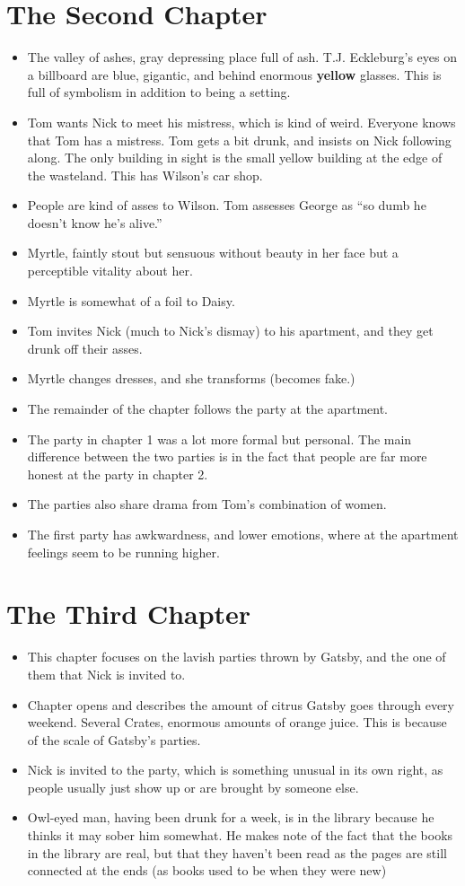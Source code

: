 \documentclass[12pt]{article}
\begin{document}
\section{The Second Chapter}
\begin{itemize}
\item The valley of ashes, gray depressing place full of ash.  T.J. 
  Eckleburg's eyes on a billboard are blue, gigantic, and behind 
  enormous {\bf yellow} glasses.  This is full of symbolism in 
  addition to being a setting.
\item Tom wants Nick to meet his mistress, which is kind of weird.  
  Everyone knows that Tom has a mistress.  Tom gets a bit drunk, 
  and insists on Nick following along.  The only building in 
  sight is the small yellow building at the edge of the 
  wasteland.  This has Wilson's car shop.
\item People are kind of asses to Wilson.  Tom assesses George as ``so 
  dumb he doesn't know he's alive.''
\item Myrtle, faintly stout but sensuous without beauty in her face 
  but a perceptible vitality about her.
\item Myrtle is somewhat of a foil to Daisy.
\item Tom invites Nick (much to Nick's dismay) to his apartment, and 
  they get drunk off their asses.
\item Myrtle changes dresses, and she transforms (becomes fake.)
\item The remainder of the chapter follows the party at the apartment.
\item The party in chapter 1 was a lot more formal but personal.  The 
  main difference between the two parties is in the fact that 
  people are far more honest at the party in chapter 2.
\item The parties also share drama from Tom's combination of women.
\item The first party has awkwardness, and lower emotions, where at 
  the apartment feelings seem to be running higher.
\end{itemize}

\section{The Third Chapter}
\begin{itemize}
\item This chapter focuses on the lavish parties thrown by Gatsby, and the one of them that Nick is invited to.
\item Chapter opens and describes the amount of citrus Gatsby goes through every weekend.  Several Crates, enormous amounts of orange juice.  This is because of the scale of Gatsby's parties.
\item Nick is invited to the party, which is something unusual in its own right, as people usually just show up or are brought by someone else.
\item Owl-eyed man, having been drunk for a week, is in the library because he thinks it may sober him somewhat.  He makes note of the fact that the books in the library are real, but that they haven't been read as the pages are still connected at the ends (as books used to be when they were new)
\end{itemize}
\end{document}
